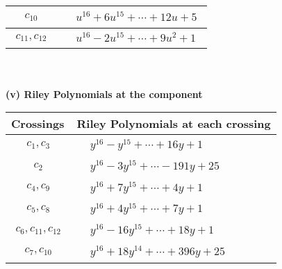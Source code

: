 \documentclass[1p]{elsarticle_modified}
\theoremstyle{definition}
\begin{document}
\begin{tabular}{m{50pt}|m{274pt}}
\hline $$\begin{aligned}c_{10}\end{aligned}$$&$\begin{aligned}
&u^{16}+6 u^{15}+\cdots+12 u+5
\end{aligned}$\\
\hline $$\begin{aligned}c_{11},c_{12}\end{aligned}$$&$\begin{aligned}
&u^{16}-2 u^{15}+\cdots+9 u^2+1
\end{aligned}$\\
\hline
\end{tabular}\\~\\
\newpage\renewcommand{\arraystretch}{1}
\flushleft \textbf{(v) Riley Polynomials at the component}\newline \\
\begin{tabular}{m{50pt}|m{274pt}}
Crossings & \hspace{64pt}Riley Polynomials at each crossing \\
\hline $$\begin{aligned}c_{1},c_{3}\end{aligned}$$&$\begin{aligned}
&y^{16}- y^{15}+\cdots+16 y+1
\end{aligned}$\\
\hline $$\begin{aligned}c_{2}\end{aligned}$$&$\begin{aligned}
&y^{16}-3 y^{15}+\cdots-191 y+25
\end{aligned}$\\
\hline $$\begin{aligned}c_{4},c_{9}\end{aligned}$$&$\begin{aligned}
&y^{16}+7 y^{15}+\cdots+4 y+1
\end{aligned}$\\
\hline $$\begin{aligned}c_{5},c_{8}\end{aligned}$$&$\begin{aligned}
&y^{16}+4 y^{15}+\cdots+7 y+1
\end{aligned}$\\
\hline $$\begin{aligned}c_{6},c_{11},c_{12}\end{aligned}$$&$\begin{aligned}
&y^{16}-16 y^{15}+\cdots+18 y+1
\end{aligned}$\\
\hline $$\begin{aligned}c_{7},c_{10}\end{aligned}$$&$\begin{aligned}
&y^{16}+18 y^{14}+\cdots+396 y+25
\end{aligned}$\\
\hline
\end{tabular}\\~\\
\end{document}
